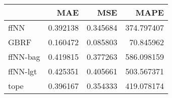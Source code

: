 \begin{tabular}{lrrr}
\toprule
{} &       MAE &       MSE &        MAPE \\
\midrule
ffNN     &  0.392138 &  0.345684 &  374.797407 \\
GBRF     &  0.160472 &  0.085803 &   70.845962 \\
ffNN-bag &  0.419815 &  0.377263 &  586.098159 \\
ffNN-lgt &  0.425351 &  0.405661 &  503.567371 \\
tope     &  0.396167 &  0.354333 &  419.078174 \\
\bottomrule
\end{tabular}
